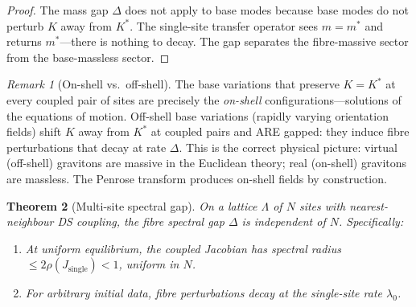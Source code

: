 \documentclass[11pt,a4paper]{article}
\newtheorem{theorem}{Theorem}[section]
\theoremstyle{definition}
\theoremstyle{remark}
\newtheorem{remark}[theorem]{Remark}
\begin{document}
\begin{proof}
The mass gap $\Delta$ does not apply to base modes because base modes do not perturb $K$ away from $K^*$. The single-site transfer operator sees $m=m^*$ and returns $m^*$---there is nothing to decay. The gap separates the fibre-massive sector from the base-massless sector.
\end{proof}

\begin{remark}[On-shell vs.\ off-shell]
The base variations that preserve $K=K^*$ at every coupled pair of sites are precisely the \emph{on-shell} configurations---solutions of the equations of motion. Off-shell base variations (rapidly varying orientation fields) shift $K$ away from $K^*$ at coupled pairs and ARE gapped: they induce fibre perturbations that decay at rate $\Delta$. This is the correct physical picture: virtual (off-shell) gravitons are massive in the Euclidean theory; real (on-shell) gravitons are massless. The Penrose transform produces on-shell fields by construction.
\end{remark}

\begin{theorem}[Multi-site spectral gap]\label{thm:multisite}
On a lattice $\Lambda$ of $N$ sites with nearest-neighbour DS coupling, the fibre spectral gap $\Delta$ is independent of $N$. Specifically:
\begin{enumerate}[nosep]
\item At uniform equilibrium, the coupled Jacobian has spectral radius $\leq 2\rho(J_{\mathrm{single}})<1$, uniform in $N$.
\item For arbitrary initial data, fibre perturbations decay at the single-site rate $\lambda_0$.
\end{enumerate}
\end{theorem}
\end{document}
